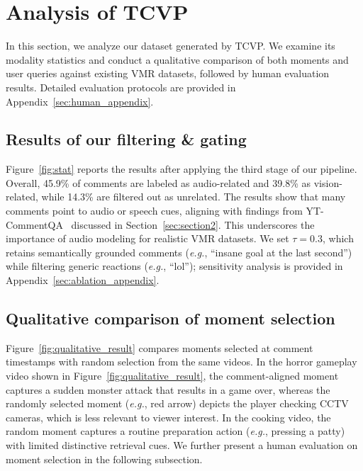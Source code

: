 \documentclass[11pt]{article}
\newcommand{\eg}{\emph{e.g.}}
\newcommand{\figref}[1]{Figure~\ref{#1}}
\newcommand{\secref}[1]{Section~\ref{#1}}
\begin{document}



\section{Analysis of TCVP}

In this section, we analyze our dataset generated by TCVP. 
We examine its modality statistics and conduct a qualitative comparison of both moments and user queries against existing VMR datasets, followed by human evaluation results. 
Detailed evaluation protocols are provided in Appendix~\ref{sec:human_appendix}.

\subsection{Results of our filtering \& gating}
Figure~\ref{fig:stat} reports the results after applying the third stage of our pipeline.
Overall, 45.9\% of comments are labeled as audio-related and 39.8\% as vision-related, while 14.3\% are filtered out as unrelated.
The results show that many comments point to audio or speech cues, aligning with findings from YT-CommentQA~\cite{yang2024ytcommentqa} discussed in \secref{sec:section2}.
This underscores the importance of audio modeling for realistic VMR datasets.
We set $\tau\!=\!0.3$, which retains semantically grounded comments (\eg, ``insane goal at the last second'') while filtering generic reactions (\eg, ``lol''); sensitivity analysis is provided in Appendix~\ref{sec:ablation_appendix}.             


\subsection{Qualitative comparison of moment selection}
Figure~\ref{fig:qualitative_result} compares moments selected at comment timestamps with random selection from the same videos.
In the horror gameplay video shown in \figref{fig:qualitative_result}, the comment-aligned moment captures a sudden monster attack that results in a game over, whereas the randomly selected moment (\eg, red arrow) depicts the player checking CCTV cameras, which is less relevant to viewer interest.
In the cooking video, the random moment captures a routine preparation action (\eg, pressing a patty) with limited distinctive retrieval cues.
We further present a human evaluation on moment selection in the following subsection.
\end{document}
